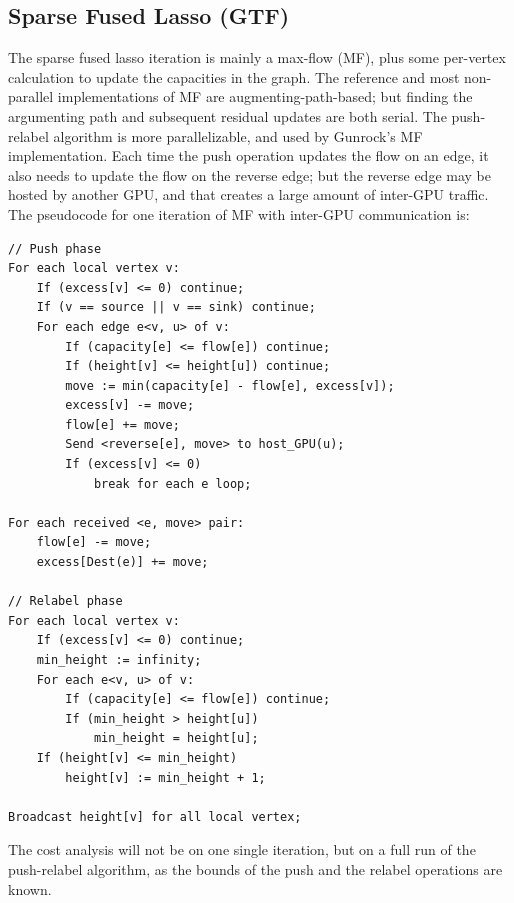 \documentclass[10pt,oneside]{memoir}
\begin{document}
\hypertarget{sparse-fused-lasso-gtf}{%
\subsection{Sparse Fused Lasso (GTF)}\label{sparse-fused-lasso-gtf}}

The sparse fused lasso iteration is mainly a max-flow (MF), plus some
per-vertex calculation to update the capacities in the graph. The
reference and most non-parallel implementations of MF are
augmenting-path-based; but finding the argumenting path and subsequent
residual updates are both serial. The push-relabel algorithm is more
parallelizable, and used by Gunrock's MF implementation. Each time the
push operation updates the flow on an edge, it also needs to update the
flow on the reverse edge; but the reverse edge may be hosted by another
GPU, and that creates a large amount of inter-GPU traffic. The
pseudocode for one iteration of MF with inter-GPU communication is:

\begin{verbatim}
// Push phase
For each local vertex v:
    If (excess[v] <= 0) continue;
    If (v == source || v == sink) continue;
    For each edge e<v, u> of v:
        If (capacity[e] <= flow[e]) continue;
        If (height[v] <= height[u]) continue;
        move := min(capacity[e] - flow[e], excess[v]);
        excess[v] -= move;
        flow[e] += move;
        Send <reverse[e], move> to host_GPU(u);
        If (excess[v] <= 0)
            break for each e loop;

For each received <e, move> pair:
    flow[e] -= move;
    excess[Dest(e)] += move;

// Relabel phase
For each local vertex v:
    If (excess[v] <= 0) continue;
    min_height := infinity;
    For each e<v, u> of v:
        If (capacity[e] <= flow[e]) continue;
        If (min_height > height[u])
            min_height = height[u];
    If (height[v] <= min_height)
        height[v] := min_height + 1;

Broadcast height[v] for all local vertex;
\end{verbatim}

The cost analysis will not be on one single iteration, but on a full run
of the push-relabel algorithm, as the bounds of the push and the relabel
operations are known.
\end{document}
